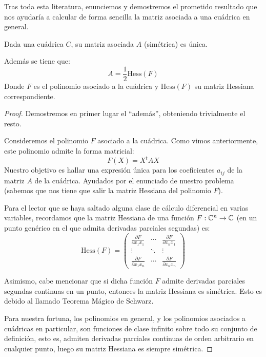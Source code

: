 Tras toda esta literatura, enunciemos y demostremos el prometido resultado que nos ayudaría a calcular de forma sencilla la matriz asociada a una cuádrica en general.
\begin{lem}
	\label{C8_lem_Hessiana}
	Dada una cuádrica $C$, su matriz asociada $A$ (simétrica) es única.

Además se tiene que: \[A=\frac{1}{2}\mathrm{Hess}(F)\]
Donde $F$ es el polinomio asociado a la cuádrica y $\mathrm{Hess}(F)$ su matriz Hessiana correspondiente.
\end{lem}
\begin{proof}
Demostremos en primer lugar el ``además'', obteniendo trivialmente el resto.

Consideremos el polinomio $F$ asociado a la cuádrica. Como vimos anteriormente, este polinomio admite la forma matricial:
\[F(X)=X^tAX\]
Nuestro objetivo es hallar una expresión única para los coeficientes $a_{ij}$ de la matriz $A$ de la cuádrica. Ayudados por el enunciado de nuestro problema (sabemos que nos tiene que salir la matriz Hessiana del polinomio $F$).

Para el lector que se haya saltado alguna clase de cálculo diferencial en varias variables, recordamos que la matriz Hessiana de una función $F:\mathbb{C}^n\to\mathbb{C}$ (en un punto genérico en el que admita derivadas parciales segundas) es:
\[\mathrm{Hess}(F)=\begin{pmatrix}
\frac{\partial F}{\partial x_1x_1} & \cdots &\frac{\partial F}{\partial x_nx_1}\\
\vdots & \ddots & \vdots\\
\frac{\partial F}{\partial x_1x_n} & \cdots & \frac{\partial F}{\partial x_nx_n}
\end{pmatrix}\]

Asimismo, cabe mencionar que si dicha función $F$ admite derivadas parciales segundas continuas en un punto, entonces la matriz Hessiana es simétrica. Esto es debido al llamado Teorema Mágico de Schwarz.

Para nuestra fortuna, los polinomios en general, y los polinomios asociados a cuádricas en particular, son funciones de clase infinito sobre todo su conjunto de definición, esto es, admiten derivadas parciales continuas de orden arbitrario en cualquier punto, luego su matriz Hessiana es siempre simétrica.


\end{proof}
